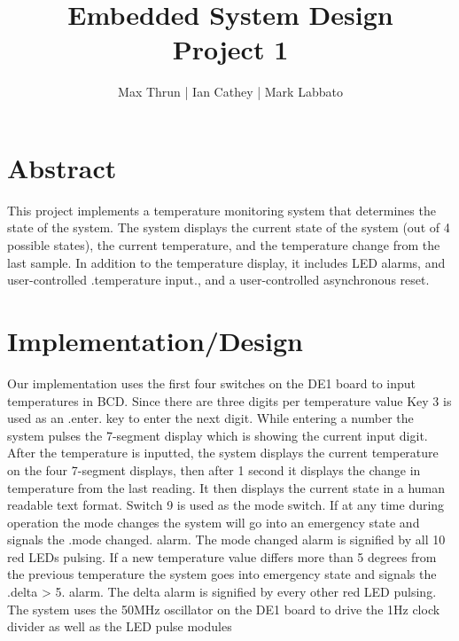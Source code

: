 \documentclass[12pt]{article}
\title{Embedded System Design \\ Project 1}
\author{ Max Thrun | Ian Cathey | Mark Labbato }
\begin{document}
\maketitle


\section*{Abstract}
This project implements a temperature monitoring system that determines the state of the system. The system displays the current state of the system (out of 4 possible states), the current temperature, and the temperature change from the last sample. In addition to the temperature display, it includes LED alarms, and user-controlled .temperature input., and a user-controlled asynchronous reset.


\section*{Implementation/Design}
Our implementation uses the first four switches on the DE1 board to input temperatures in BCD. Since there are three digits per temperature value Key 3 is used as an .enter. key to enter the next digit. While entering a number the system pulses the 7-segment display which is showing the current input digit.  After the temperature is inputted, the system displays the current temperature on the four 7-segment displays, then after 1 second it displays the change in temperature from the last reading. It then displays the current state in a human readable text format. Switch 9 is used as the mode switch. If at any time during operation the mode changes the system will go into an emergency state and signals the .mode changed. alarm. The mode changed alarm is signified by all 10 red LEDs pulsing. If a new temperature value differs more than 5 degrees from the previous temperature the system goes into emergency state and signals the .delta > 5. alarm. The delta alarm is signified by every other red LED pulsing. The system uses the 50MHz oscillator on the DE1 board to drive the 1Hz clock divider as well as the LED pulse modules
\end{document}
